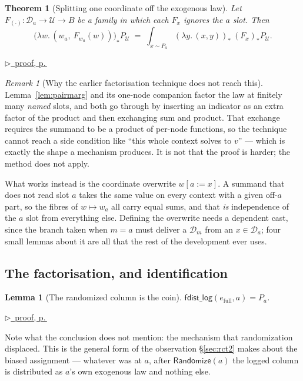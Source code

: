 \documentclass[11pt,a4paper]{article}
\theoremstyle{definition}
\theoremstyle{plain}
\newtheorem{theorem}[definition]{Theorem}
\newtheorem{lemma}[definition]{Lemma}
\theoremstyle{remark}
\newtheorem{remark}[definition]{Remark}
\newcommand{\dom}{\mathcal{D}}
\newcommand{\Ctx}{\mathcal{U}}         %
\newcommand{\push}[1]{{#1}_{*}}        %
\newcommand{\pfref}[1]{%
  \par\smallskip\noindent
  \hyperref[pf:#1]{\small$\triangleright$\ proof, p.\,\pageref{pf:#1}}\par\smallskip}
\begin{document}
\begin{theorem}[Splitting one coordinate off the exogenous law]
\label{thm:splitoff}
Let $F_{(\cdot)} : \dom_a \to \Ctx \to B$ be a family in which each $F_x$
ignores the $a$ slot. Then
\[
  \push{\bigl(\lambda w.\,(w_a,\ F_{w_a}(w))\bigr)} P_\Ctx
  \;=\;
  \int_{x \sim P_a} \push{(\lambda y.\,(x,y))}\ \push{(F_x)} P_\Ctx .
\]
\end{theorem}

\pfref{thm:splitoff}

\begin{remark}[Why the earlier factorisation technique does not reach this]
\label{rem:whyupd}
Lemma~\ref{lem:pairmarg} and its one-node companion factor the law at
finitely many \emph{named} slots, and both go through by inserting an
indicator as an extra factor of the product and then exchanging sum and
product. That exchange requires the summand to be a product of per-node
functions, so the technique cannot reach a side condition like ``this
whole context solves to $v$'' --- which is exactly the shape a mechanism
produces. It is not that the proof is harder; the method does not apply.

What works instead is the coordinate overwrite $w[a := x]$. A summand
that does not read slot $a$ takes the same value on every context with a
given off-$a$ part, so the fibres of $w \mapsto w_a$ all carry equal
sums, and that \emph{is} independence of the $a$ slot from everything
else. Defining the overwrite needs a dependent cast, since the branch
taken when $m = a$ must deliver a $\dom_m$ from an $x \in \dom_a$; four
small lemmas about it are all that the rest of the development ever uses.
\end{remark}

\subsection{The factorisation, and identification}
\label{sec:genjoint}

\begin{lemma}[The randomized column is the coin]
\label{lem:randfst}
$\mathsf{fdist\_log}(e_{\mathrm{full}}, a) = P_a$.
\end{lemma}

\pfref{lem:randfst}

Note what the conclusion does not mention: the mechanism that
randomization displaced. This is the general form of the observation
\S\ref{sec:rct2} makes about the biased assignment --- whatever was at
$a$, after $\mathsf{Randomize}(a)$ the logged column is distributed as
$a$'s own exogenous law and nothing else.
\end{document}
